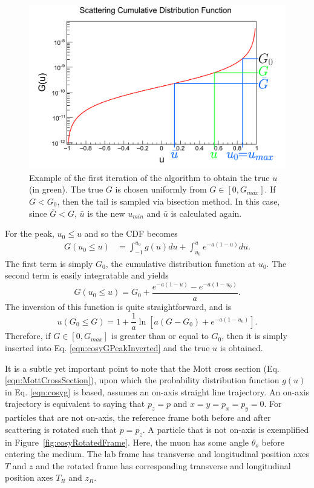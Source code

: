 \begin{figure}
  \centering
    \includegraphics[width=\textwidth]{Figures/scatdist_algorithm} 
  \caption[Example of the first iteration of the COSY CDF algorithm.]{Example of the first iteration of the algorithm to obtain the true $u$ (in green). The true $G$ is chosen uniformly from $G\in[0,G_{max}]$. If $G < G_0$, then the tail is sampled via bisection method. In this case, since $\bar{G} < G$, $\bar{u}$ is the new $u_{min}$ and $\bar{u}$ is calculated again.}
  \label{fig:scatdist_algorithm}
\end{figure}

For the peak, $u_0 \leq u$ and so the CDF becomes
\begin{align*}
G(u_0 \leq u)&=\int_{-1} ^{u_0} g(u) du + \int_{u_0} ^u e^{-a(1-u)} du.
\end{align*}
The first term is simply $G_0$, the cumulative distribution function at $u_0$. The second term is easily integratable and yields
\begin{equation}\label{eqn:cosyGPeak}
G(u_0 \leq u)=G_0 + \frac{e^{-a(1-u)}-e^{-a(1-u_0)}}{a}.
\end{equation}
The inversion of this function is quite straightforward, and is
\begin{equation} \label{eqn:cosyGPeakInverted}
u(G_0 \leq G)=1+\frac{1}{a} \ln \left[a(G-G_0)+e^{-a(1-u_0)}\right].
\end{equation}
Therefore, if $G \in [0,G_{max}]$ is greater than or equal to $G_0$, then it is simply inserted into Eq. \eqref{eqn:cosyGPeakInverted} and the true $u$ is obtained.

It is a subtle yet important point to note that the Mott cross section (Eq. \eqref{eqn:MottCrossSection}), upon which the probability distribution function $g(u)$ in Eq. \eqref{eqn:cosyg} is based, assumes an on-axis straight line trajectory. An on-axis trajectory is equivalent to saying that $p_z=p$ and $x=y=p_x = p_y =0$. For particles that are not on-axis, the reference frame both before and after scattering is rotated such that $p=p_z$. A particle that is not on-axis is exemplified in Figure~\ref{fig:cosyRotatedFrame}. Here, the muon has some angle $\theta_o$ before entering the medium. The lab frame has transverse and longitudinal position axes $T$ and $z$ and the rotated frame has corresponding transverse and longitudinal position axes $T_R$ and $z_R$.  

